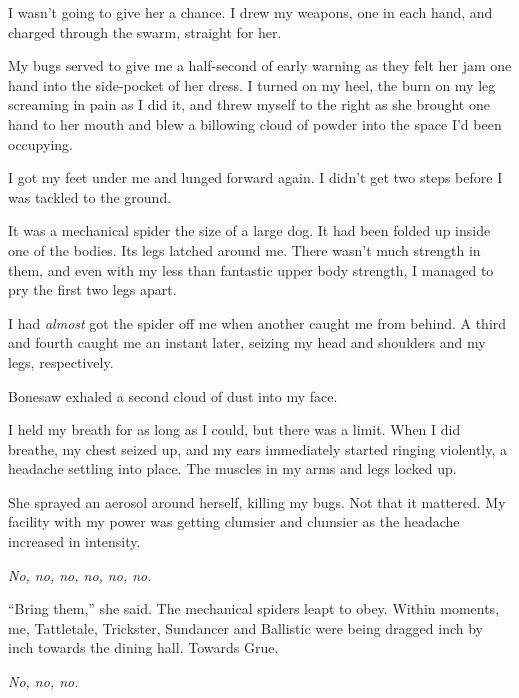 I wasn't going to give her a chance.  I drew my weapons, one in each hand, and charged through the swarm, straight for her.



My bugs served to give me a half-second of early warning as they felt her jam one hand into the side-pocket of her dress.  I turned on my heel, the burn on my leg screaming in pain as I did it, and threw myself to the right as she brought one hand to her mouth and blew a billowing cloud of powder into the space I'd been occupying.



I got my feet under me and lunged forward again.  I didn't get two steps before I was tackled to the ground.



It was a mechanical spider the size of a large dog.  It had been folded up inside one of the bodies.  Its legs latched around me.  There wasn't much strength in them, and even with my less than fantastic upper body strength, I managed to pry the first two legs apart.



I had \emph{almost} got the spider off me when another caught me from behind.  A third and fourth caught me an instant later, seizing my head and shoulders and my legs, respectively.



Bonesaw exhaled a second cloud of dust into my face.



I held my breath for as long as I could, but there was a limit.  When I did breathe, my chest seized up, and my ears immediately started ringing violently, a headache settling into place.  The muscles in my arms and legs locked up.



She sprayed an aerosol around herself, killing my bugs.  Not that it mattered.  My facility with my power was getting clumsier and clumsier as the headache increased in intensity.



\emph{No, no, no, no, no, no.}



``Bring them,'' she said.  The mechanical spiders leapt to obey.  Within moments, me, Tattletale, Trickster, Sundancer and Ballistic were being dragged inch by inch towards the dining hall.  Towards Grue.



\emph{No, no, no.}



